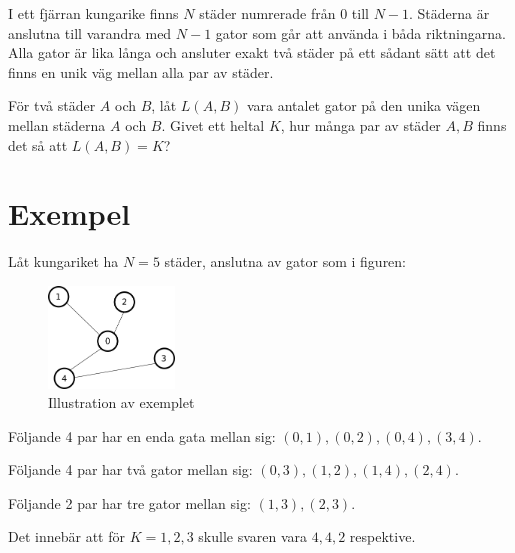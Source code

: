 \newcommand\version{v2}
I ett fjärran kungarike finns $N$ städer numrerade från $0$ till $N-1$.
Städerna är anslutna till varandra med $N-1$ gator som går att använda i båda riktningarna.
Alla gator är lika långa och ansluter exakt två städer på ett sådant sätt att det finns en unik väg mellan alla par av städer.

För två städer $A$ och $B$, låt $L(A, B)$ vara antalet gator på den unika vägen mellan städerna $A$ och $B$. 
Givet ett heltal $K$, hur många par av städer $A, B$ finns det så att $L(A, B) = K$?

\section*{Exempel}
Låt kungariket ha $N = 5$ städer, anslutna av gator som i figuren:
\begin{figure}[h!]
  \centering
  \includegraphics[width=0.3\textwidth]{sample.png}
  \caption{Illustration av exemplet}
\end{figure}

Följande 4 par har en enda gata mellan sig: $(0, 1), (0, 2), (0, 4), (3, 4)$.

Följande 4 par har två gator mellan sig: $(0, 3), (1, 2), (1, 4), (2, 4)$.

Följande 2 par har tre gator mellan sig: $(1, 3), (2, 3)$.

Det innebär att för $K = 1, 2, 3$ skulle svaren vara $4, 4, 2$ respektive.

